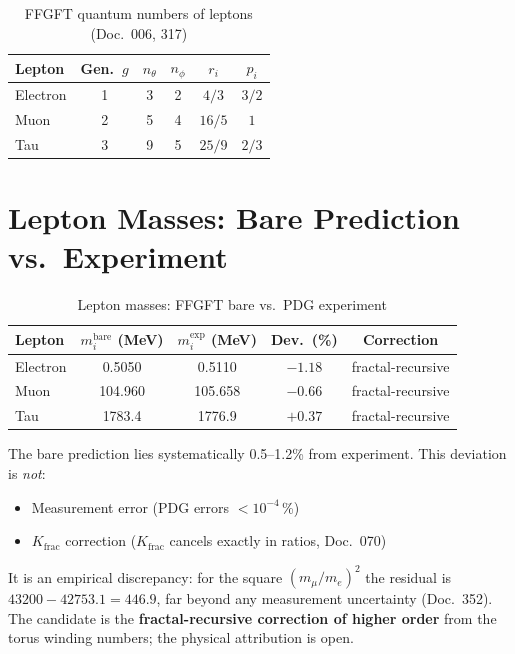 \begin{table}[H]
\centering
\caption{FFGFT quantum numbers of leptons (Doc.~006, 317)}
\begin{tabular}{lccccc}
\toprule
Lepton & Gen.\ $g$ & $n_\theta$ & $n_\phi$ & $r_i$ & $p_i$ \\
\midrule
Electron & 1 & 3 & 2 & $4/3$  & $3/2$ \\
Muon     & 2 & 5 & 4 & $16/5$ & $1$   \\
Tau      & 3 & 9 & 5 & $25/9$ & $2/3$ \\
\bottomrule
\end{tabular}
\end{table}

\section{Lepton Masses: Bare Prediction vs.\ Experiment}

\begin{table}[H]
\centering
\caption{Lepton masses: FFGFT bare vs.\ PDG experiment}
\begin{tabular}{lcccc}
\toprule
Lepton & $m_i^{\text{bare}}$ (MeV) & $m_i^{\text{exp}}$ (MeV) & Dev.\ (\%) & Correction \\
\midrule
Electron & 0.5050  & 0.5110   & $-1.18$ & fractal-recursive \\
Muon     & 104.960 & 105.658  & $-0.66$ & fractal-recursive \\
Tau      & 1783.4  & 1776.9   & $+0.37$ & fractal-recursive \\
\bottomrule
\end{tabular}
\end{table}

The bare prediction lies systematically 0.5--1.2\% from experiment.
This deviation is \emph{not}:
\begin{itemize}
  \item Measurement error (PDG errors $< 10^{-4}$\,\%)
  \item $K_\text{frac}$ correction ($K_\text{frac}$ cancels exactly in ratios, Doc.~070)
\end{itemize}
It is an empirical discrepancy: for the square $(m_\mu/m_e)^2$ the residual
is $43200 - 42753.1 = 446.9$, far beyond any measurement uncertainty
(Doc.~352). The candidate is the \textbf{fractal-recursive correction of
higher order} from the torus winding numbers; the physical attribution is open.

